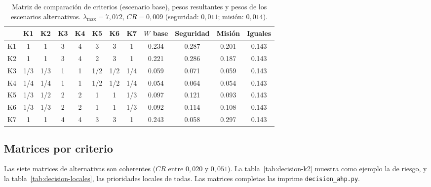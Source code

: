 \begin{table}[H]
\centering\small
\caption{Matriz de comparación de criterios (escenario base), pesos resultantes y pesos de
los escenarios alternativos. $\lambda_{\max}=7{,}072$, $CR=0{,}009$ (seguridad:
$0{,}011$; misión: $0{,}014$).}
\label{tab:decision-wcrit}
\setlength{\tabcolsep}{4pt}
\begin{tabular}{@{}l*{7}{c}cccc@{}}
\toprule
 & K1 & K2 & K3 & K4 & K5 & K6 & K7 & $W$ base & Seguridad & Misión & Iguales\\\midrule
K1 & 1 & 1 & 3 & 4 & 3 & 3 & 1 & \num{0.234} & \num{0.287} & \num{0.201} & \num{0.143}\\
K2 & 1 & 1 & 3 & 4 & 2 & 3 & 1 & \num{0.221} & \num{0.286} & \num{0.187} & \num{0.143}\\
K3 & 1/3 & 1/3 & 1 & 1 & 1/2 & 1/2 & 1/4 & \num{0.059} & \num{0.071} & \num{0.059} & \num{0.143}\\
K4 & 1/4 & 1/4 & 1 & 1 & 1/2 & 1/2 & 1/4 & \num{0.054} & \num{0.064} & \num{0.054} & \num{0.143}\\
K5 & 1/3 & 1/2 & 2 & 2 & 1 & 1 & 1/3 & \num{0.097} & \num{0.121} & \num{0.093} & \num{0.143}\\
K6 & 1/3 & 1/3 & 2 & 2 & 1 & 1 & 1/3 & \num{0.092} & \num{0.114} & \num{0.108} & \num{0.143}\\
K7 & 1 & 1 & 4 & 4 & 3 & 3 & 1 & \num{0.243} & \num{0.058} & \num{0.297} & \num{0.143}\\
\bottomrule
\end{tabular}
\end{table}

\subsection{Matrices por criterio}
Las siete matrices de alternativas son coherentes ($CR$ entre $0{,}020$ y $0{,}051$). La
tabla~\ref{tab:decision-k2} muestra como ejemplo la de riesgo, y la
tabla~\ref{tab:decision-locales}, las prioridades locales de todas. Las matrices
completas las imprime \texttt{decision\_ahp.py}.

